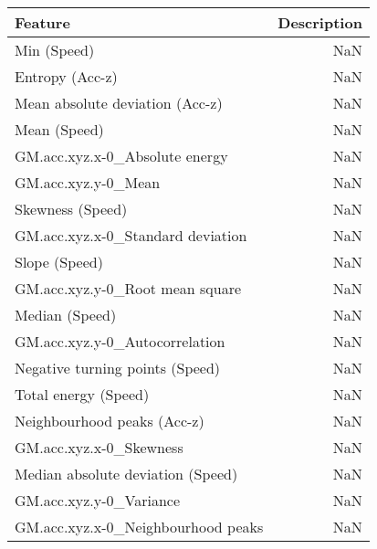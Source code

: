 \begin{table}
\centering
\label{table:reg_fs}
\begin{tabular}{lr}
\toprule
                  \textbf{Feature} & \textbf{Description} \\
\midrule
                       Min (Speed) &                  NaN \\
                   Entropy (Acc-z) &                  NaN \\
   Mean absolute deviation (Acc-z) &                  NaN \\
                      Mean (Speed) &                  NaN \\
    GM.acc.xyz.x-0_Absolute energy &                  NaN \\
               GM.acc.xyz.y-0_Mean &                  NaN \\
                  Skewness (Speed) &                  NaN \\
 GM.acc.xyz.x-0_Standard deviation &                  NaN \\
                     Slope (Speed) &                  NaN \\
   GM.acc.xyz.y-0_Root mean square &                  NaN \\
                    Median (Speed) &                  NaN \\
    GM.acc.xyz.y-0_Autocorrelation &                  NaN \\
   Negative turning points (Speed) &                  NaN \\
              Total energy (Speed) &                  NaN \\
       Neighbourhood peaks (Acc-z) &                  NaN \\
           GM.acc.xyz.x-0_Skewness &                  NaN \\
 Median absolute deviation (Speed) &                  NaN \\
           GM.acc.xyz.y-0_Variance &                  NaN \\
GM.acc.xyz.x-0_Neighbourhood peaks &                  NaN \\
\bottomrule
\end{tabular}
\end{table}

